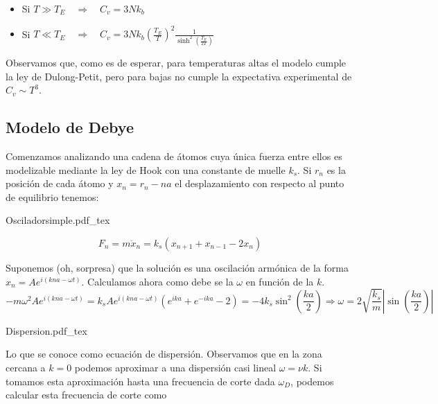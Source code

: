 \documentclass[leqno]{article}
\newcommand{\incfig}[1]{%
\center
\def\svgwidth{0.9\columnwidth}
{#1.pdf_tex}
}
\begin{document}
\begin{itemize}[topsep=-6pt, itemsep=0pt]
  \item Si  $T\gg T_E \quad \Rightarrow \quad C_v = 3Nk_b$
  \item Si  $T\ll T_E \quad \Rightarrow \quad C_v = 3Nk_b (\frac{T_E}{T})^2 \frac{1}{\sinh ^2(\frac{T_E}{2T})}$
\end{itemize}

Observamos que, como es de esperar, para temperaturas altas el modelo cumple la ley de Dulong-Petit, pero para bajas no cumple la expectativa experimental de $C_v \sim  T^3$.


\subsection{Modelo de Debye}
\begin{minipage}{0.7\textwidth}
Comenzamos analizando una cadena de átomos cuya única fuerza entre ellos es modelizable mediante la ley de Hook con una constante de muelle $k_s$. Si  $r_n$ es la posición de cada átomo y $x_n = r_n-na$ el desplazamiento con respecto al punto de equilibrio tenemos:
\end{minipage}
\begin{minipage}{0.3\textwidth}
  \incfig{Osciladorsimple}
\end{minipage}
 \[
F_n =m\ddot{x}_n = k_s(x_{n+1}+x_{n-1}-2x_n)
\] 

Suponemos (oh, sorpresa) que la solución es una oscilación armónica de la forma $x_n = A e^{i(kna-\omega t)}$. Calculamos ahora como debe se la $\omega $ en función de la $k$.
 \[
   -m\omega ^2 Ae^{i(kna-\omega t)} = k_sAe^{i(kna-\omega t)}(e^{ika}+e^{-ika}-2) = -4k_s \sin^2\left( \frac{ka}{2} \right)  \Rightarrow \boxed{\omega = 2 \sqrt{\frac{k_s}{m}}\left|\sin \left( \frac{ka}{2} \right) \right| }
\] 

\begin{minipage}{0.2\textwidth}
  \incfig{Dispersion}
\end{minipage}
\begin{minipage}{0.8\textwidth}
Lo que se conoce como ecuación de dispersión. Observamos que en la zona cercana a $k=0$ podemos aproximar a una dispersión casi lineal  $\omega =\nu k$. Si tomamos esta aproximación hasta una frecuencia de corte dada $\omega _D$, podemos calcular esta frecuencia de corte como
\end{minipage}
\end{document}
